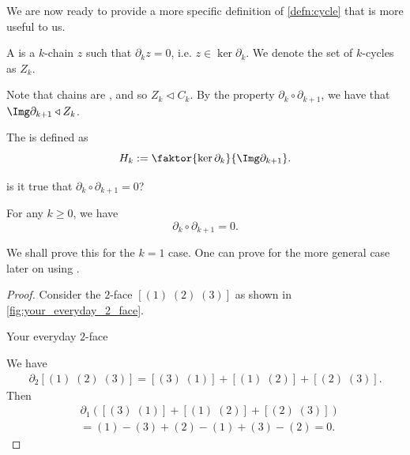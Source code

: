 \documentclass[notoc,notitlepage]{tufte-book}
\begin{document}
We are now ready to provide a more specific definition of \cref{defn:cycle} that
is more useful to us.

\begin{defn}[$k$-cycles]\label{defn:_k_cycles}
  A  is a $k$-chain $z$ such that $\partial_k z = 0$, i.e.
  $z \in \ker \partial_k$. We denote the set of $k$-cycles as $Z_k$.
\end{defn}

Note that chains are , and so $Z_k \triangleleft
C_k$. By the property $\partial_k \circ \partial_{k + 1}$, we have that $\Img
\partial_{k + 1} \triangleleft Z_k$.

\begin{defn}\label{defn:homology_groups}
  The  is defined as
  \begin{equation*}
    H_k := \faktor{\ker \partial_k}{\Img \partial_{k + 1}}.
  \end{equation*}
\end{defn}

 is it true that $\partial_k \circ \partial_{k + 1} = 0$?

\begin{propo}\label{propo:boundary_of_a_boundary_is_zero}
  For any $k \geq 0$, we have
  \begin{equation*}
    \partial_k \circ \partial_{k + 1} = 0.
  \end{equation*}
\end{propo}

We shall prove this for the $k = 1$ case. One can prove for the more general
case later on using .

\begin{proof}
  Consider the $2$-face $[(1) \; (2) \; (3)]$ as shown in
  \cref{fig:your_everyday_2_face}.
  \begin{marginfigure}
    \centering
    \caption{Your everyday $2$-face}\label{fig:your_everyday_2_face}
  \end{marginfigure}
  We have
  \begin{align*}
    \partial_2 [(1) \; (2) \; (3)] = [ (3) \; (1) ] + [ (1) \; (2) ] + [ (2) \;
    (3)].
  \end{align*}
  Then
  \begin{align*}
    &\partial_1 ([(3) \; (1)] + [(1) \; (2)] + [(2) \; (3)]) \\
    &= (1) - (3) + (2) - (1) + (3) - (2) = 0.
  \end{align*}
\end{proof}
\end{document}
